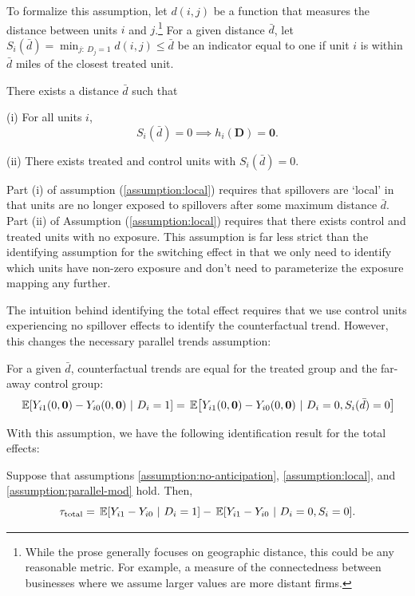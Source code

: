 To formalize this assumption, let $d(i,j)$ be a function that measures the distance between units $i$ and $j$.\footnote{
  While the prose generally focuses on geographic distance, this could be any reasonable metric. For example, a measure of the connectedness between businesses where we assume larger values are more distant firms.
} 
For a given distance $\bar{d}$, let $S_{i}(\bar{d}) = \min_{j: \ D_j = 1} d(i,j) \leq \bar{d}$ be an indicator equal to one if unit $i$ is within $\bar{d}$ miles of the closest treated unit.
\begin{assumption}\label{assumption:local}
  There exists a distance $\bar{d}$ such that 
  
  (i) For all units $i$,
  \[ 
      S_i(\bar{d}) = 0 \implies h_i(\bm{D}) = \bm{0}. 
  \]

  (ii) There exists treated and control units with $S_i(\bar{d}) = 0$.
\end{assumption}

Part (i) of assumption (\ref{assumption:local}) requires that spillovers are `local' in that units are no longer exposed to spillovers after some maximum distance $\bar{d}$. Part (ii) of Assumption (\ref{assumption:local}) requires that there exists control and treated units with no exposure. This assumption is far less strict than the identifying assumption for the switching effect in that we only need to identify which units have non-zero exposure and don't need to parameterize the exposure mapping any further.

The intuition behind identifying the total effect requires that we use control units experiencing no spillover effects to identify the counterfactual trend. However, this changes the necessary parallel trends assumption:
\begin{assumption}\label{assumption:parallel-mod}
  For a given $\bar{d}$, counterfactual trends are equal for the treated group and the far-away control group:
  $$
      \expec{Y_{i1}(0, \bm{0}) - Y_{i0}(0, \bm{0}) \ \vert \ D_i = 1}= 
      \expec{Y_{i1}(0, \bm{0}) - Y_{i0}(0, \bm{0}) \ \vert \ D_i = 0, S_i(\bar{d}) = 0}
  $$
\end{assumption}
With this assumption, we have the following identification result for the total effects:
\begin{proposition}\label{prop:total_effect}
  Suppose that assumptions \ref{assumption:no-anticipation}, \ref{assumption:local}, and \ref{assumption:parallel-mod} hold. Then,
  \begin{equation}\label{eq:id_total}
    \tau_{\text{total}} = \expec{Y_{i1} - Y_{i0} \ \vert \ D_i = 1} - \expec{Y_{i1} - Y_{i0} \ \vert \ D_i = 0, S_i =0}.
  \end{equation}
\end{proposition}

